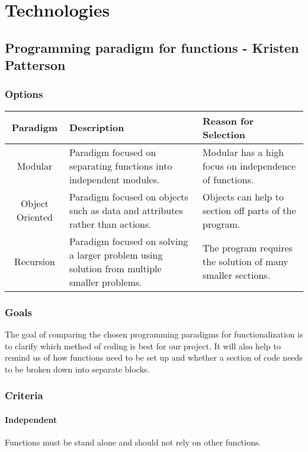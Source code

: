 \section{Technologies}

\subsection{Programming paradigm for functions - Kristen Patterson}
\subsubsection{Options}
\begin{center}
\begin{tabular}{ ||C|L|L|| } 
\hline
Paradigm & Description & Reason for Selection \\
 \hline
 Modular & Paradigm focused on separating functions into independent modules. & Modular has a high focus on independence of functions. \\ 
 \hline
 Object Oriented & Paradigm focused on objects such as data and attributes rather than actions. & Objects can help to section off parts of the program. \\ 
 \hline
 Recursion & Paradigm focused on solving a larger problem using solution from multiple smaller problems. & The program requires the solution of many smaller sections. \\ 
 \hline
\end{tabular}
\end{center}

\subsubsection{Goals}
The goal of comparing the chosen programming paradigms for functionalization is to clarify which method of coding is best for our project. It will also help to remind us of how functions need to be set up and whether a section of code needs to be broken down into separate blocks.

\subsubsection{Criteria}
\paragraph{Independent}
Functions must be stand alone and should not rely on other functions.


